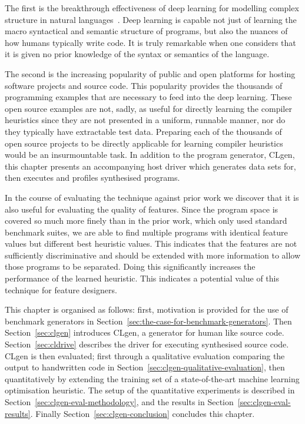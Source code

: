 The first is the breakthrough effectiveness of deep learning for modelling complex structure in natural languages~\cite{Graves2013,Sutskever2014}. Deep learning is capable not just of learning the macro syntactical and semantic structure of programs, but also the nuances of how humans typically write code. It is truly remarkable when one considers that it is given no prior knowledge of the syntax or semantics of the language.

The second is the increasing popularity of public and open platforms for hosting software projects and source code. This popularity provides the thousands of programming examples that are necessary to feed into the deep learning. These open source examples are not, sadly, as useful for directly learning the compiler heuristics since they are not presented in a uniform, runnable manner, nor do they typically have extractable test data. Preparing each of the thousands of open source projects to be directly applicable for learning compiler heuristics would be an insurmountable task. In addition to the program generator, CLgen, this chapter presents an accompanying host driver which generates data sets for, then executes and profiles synthesised programs.

In the course of evaluating the technique against prior work we discover that it is also useful for evaluating the quality of features. Since the program space is covered so much more finely than in the prior work, which only used standard benchmark suites, we are able to find multiple programs with identical feature values but different best heuristic values. This indicates that the features are not sufficiently discriminative and should be extended with more information to allow those programs to be separated. Doing this significantly increases the performance of the learned heuristic. This indicates a potential value of this technique for feature designers.

This chapter is organised as follows: first, motivation is provided for the use of benchmark generators in Section~\ref{sec:the-case-for-benchmark-generators}. Then Section~\ref{sec:clgen} introduces CLgen, a generator for human like source code. Section~\ref{sec:cldrive} describes the driver for executing synthesised source code. CLgen is then evaluated; first through a qualitative evaluation comparing the output to handwritten code in Section~\ref{sec:clgen-qualitative-evaluation}, then quantitatively by extending the training set of a state-of-the-art machine learning optimisation heuristic. The setup of the quantitative experiments is described in Section~\ref{sec:clgen-eval-methodology}, and the results in Section~\ref{sec:clgen-eval-results}. Finally Section~\ref{sec:clgen-conclusion} concludes this chapter.